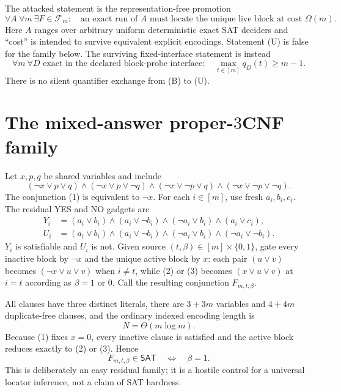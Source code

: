 \documentclass[11pt]{article}
\newcommand{\SAT}{\mathsf{SAT}}
\begin{document}
The attacked statement is the representation-free promotion
\begin{equation}
 \forall A\ \forall m\ \exists F\in\mathcal F_m:\quad
 \text{an exact run of $A$ must locate the unique live block at cost }
 \Omega(m).                                                     \tag{U}
\end{equation}
Here $A$ ranges over arbitrary uniform deterministic exact SAT deciders and
``cost'' is intended to survive equivalent explicit encodings.  Statement
(U) is false for the family below.  The surviving fixed-interface statement
is instead
\begin{equation}
 \forall m\ \forall D\text{ exact in the declared block-probe interface}:
 \quad\max_{t\in[m]}q_D(t)\ge m-1.                              \tag{B}
\end{equation}
There is no silent quantifier exchange from (B) to (U).

\section{The mixed-answer proper-$3$CNF family}

Let $x,p,q$ be shared variables and include
\begin{equation}
 (\neg x\vee p\vee q)\wedge(\neg x\vee p\vee\neg q)\wedge
 (\neg x\vee\neg p\vee q)\wedge(\neg x\vee\neg p\vee\neg q).
                                                               \tag{1}
\end{equation}
The conjunction (1) is equivalent to $\neg x$.  For each
$i\in[m]$, use fresh $a_i,b_i,c_i$.  The residual YES and NO gadgets are
\begin{align}
Y_i&=(a_i\vee b_i)\wedge(a_i\vee\neg b_i)\wedge
     (\neg a_i\vee b_i)\wedge(a_i\vee c_i),                    \tag{2}\\
U_i&=(a_i\vee b_i)\wedge(a_i\vee\neg b_i)\wedge
     (\neg a_i\vee b_i)\wedge(\neg a_i\vee\neg b_i).          \tag{3}
\end{align}
$Y_i$ is satisfiable and $U_i$ is not.  Given source
$(t,\beta)\in[m]\times\{0,1\}$, gate every inactive block by $\neg x$ and
the unique active block by $x$: each pair $(u\vee v)$ becomes
$(\neg x\vee u\vee v)$ when $i\ne t$, while (2) or (3) becomes
$(x\vee u\vee v)$ at $i=t$ according as $\beta=1$ or $0$.
Call the resulting conjunction $F_{m,t,\beta}$.

All clauses have three distinct literals, there are $3+3m$ variables and
$4+4m$ duplicate-free clauses, and the ordinary indexed encoding length is
\begin{equation}
 N=\Theta(m\log m).                                             \tag{4}
\end{equation}
Because (1) fixes $x=0$, every inactive clause is satisfied and the active
block reduces exactly to (2) or (3).  Hence
\begin{equation}
 F_{m,t,\beta}\in\SAT\quad\Longleftrightarrow\quad\beta=1.      \tag{5}
\end{equation}
This is deliberately an easy residual family; it is a hostile control for a
universal locator inference, not a claim of SAT hardness.
\end{document}
